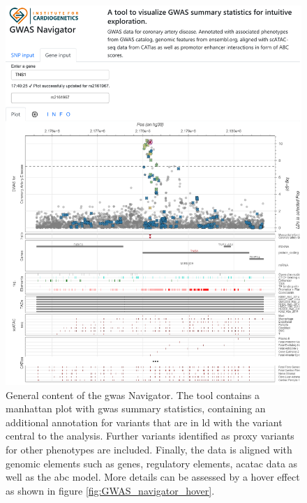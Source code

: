     \begin{figure}[H]
        \vspace*{-0.5cm}
        \capstart
        \centering
        \includegraphics{Abbildung/GWAS_navigator_screenshot.pdf}

        \begin{minipage}{\captionwidth}
            \caption[database]{\newline
            General content of the \ac{gwas} Navigator. The tool contains a manhattan plot with \ac{gwas} summary statistics, containing an additional annotation for variants that are in \ac{ld} with the variant central to the analysis. Further variants identified as proxy variants for other phenotypes are included. Finally, the data is aligned with genomic elements such as genes, regulatory elements, ac\ac{atac} data as well as the \ac{abc} model. More details can be assessed by a hover effect as shown in figure \ref{fig:GWAS_navigator_hover}.}
            \label{fig:navigator}
        \end{minipage}
    \end{figure}

